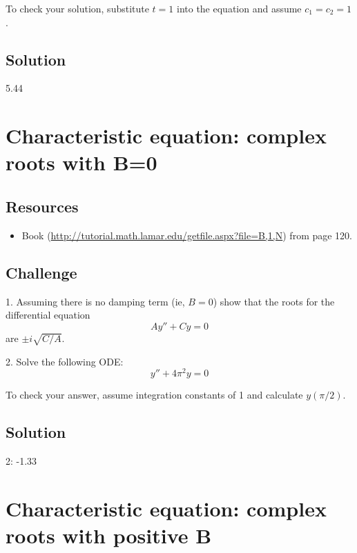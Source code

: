 To check your solution, substitute $t=1$ into the equation and assume $c_1 = c_2 = 1$.

\subsection*{Solution}
5.44 %

\timebox




\newpage
\section{Characteristic equation: complex roots with B=0}

\subsection*{Resources}
\begin{itemize}
    \item Book (\url{http://tutorial.math.lamar.edu/getfile.aspx?file=B,1,N}) from page 120.
\end{itemize}

\subsection*{Challenge}
1. Assuming there is no damping term (ie, $B=0$) show that the roots for the differential equation
\begin{equation}
    A y'' + Cy = 0
\end{equation}
are $\pm i \sqrt{C/A}$.

2. Solve the following ODE:
\begin{equation}
    \label{eq:cecr}
    y'' + 4 \pi^2 y = 0
\end{equation}

To check your answer, assume integration constants of 1 and calculate $y(\pi/2)$. %

\subsection*{Solution}
2: -1.33

\timebox




\newpage
\section{Characteristic equation: complex roots with positive B}

